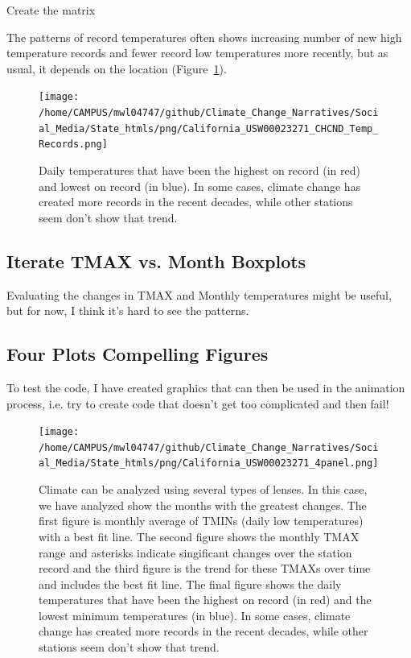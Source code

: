 \documentclass{article}\usepackage[]{graphicx}\usepackage[]{color}
\makeatletter
\newenvironment{kframe}{%
 \def\at@end@of@kframe{}%
 \ifinner\ifhmode%
  \def\at@end@of@kframe{\end{minipage}}%
  \begin{minipage}{\columnwidth}%
 \fi\fi%
 \def\FrameCommand##1{\hskip\@totalleftmargin \hskip-\fboxsep
 \colorbox{shadecolor}{##1}\hskip-\fboxsep
     \hskip-\linewidth \hskip-\@totalleftmargin \hskip\columnwidth}%
 \MakeFramed {\advance\hsize-\width
   \@totalleftmargin\z@ \linewidth\hsize
   \@setminipage}}%
 {\par\unskip\endMakeFramed%
 \at@end@of@kframe}
\newenvironment{knitrout}{}{} %
\makeatother
\begin{document}
Create the matrix
\begin{knitrout}
\color{fgcolor}\begin{kframe}


{\ttfamily\noindent\bfseries\color{errorcolor}{\#\# Error in TMAX.mat.noleap[j, year.seq\$Col[year.seq\$Year == i]] <- CHCND.noleap\$TMAX[CHCND.noleap\$Year == : replacement has length zero}}\end{kframe}
\end{knitrout}




The patterns of record temperatures often shows increasing number of new high temperature records  and fewer record low temperatures more recently, but as usual, it depends on the location (Figure~\ref{fig:Records}).
\begin{figure}
\texttt{[image: /home/CAMPUS/mwl04747/github/Climate\_Change\_Narratives/Social\_Media/State\_htmls/png/California\_USW00023271\_CHCND\_Temp\_Records.png]}
\caption{Daily temperatures that have been the highest on record (in red) and lowest on record (in blue). In some cases, climate change has created more records in the recent decades, while other stations seem don't show that trend.}
\label{fig:Records}
\end{figure}

\subsection{Iterate TMAX vs. Month Boxplots}

Evaluating the changes in TMAX and Monthly temperatures might be useful, but for now, I think it's hard to see the patterns. 




\subsection{Four Plots Compelling Figures}

To test the code, I have created graphics that can then be used in the animation process, i.e. try to create code that doesn't get too complicated and then fail! 



\begin{figure}
\texttt{[image: /home/CAMPUS/mwl04747/github/Climate\_Change\_Narratives/Social\_Media/State\_htmls/png/California\_USW00023271\_4panel.png]}
\caption{Climate can be analyzed using several types of lenses. In this case, we have analyzed show the months with the greatest changes. The first figure is monthly average of TMINs (daily low temperatures) with a best fit line. The second figure shows the monthly TMAX range and asterisks indicate singificant changes over the station record and the third figure is the trend for these TMAXs over time and includes the best fit line. The final figure shows the daily temperatures that have been the highest on record (in red) and the lowest minimum temperatures (in blue). In some cases, climate change has created more records in the recent decades, while other stations seem don't show that trend.}
\label{fig:4panel}
\end{figure}
\end{document}

